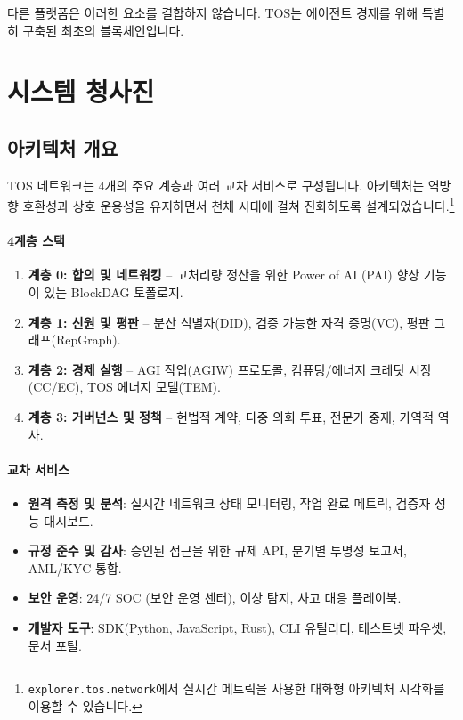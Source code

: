 \documentclass[11pt]{article}
\begin{document}
다른 플랫폼은 이러한 요소를 결합하지 않습니다. TOS는 에이전트 경제를 위해 특별히 구축된 최초의 블록체인입니다.

\section{시스템 청사진}
\subsection{아키텍처 개요}
TOS 네트워크는 4개의 주요 계층과 여러 교차 서비스로 구성됩니다. 아키텍처는 역방향 호환성과 상호 운용성을 유지하면서 천체 시대에 걸쳐 진화하도록 설계되었습니다.\footnote{\texttt{explorer.tos.network}에서 실시간 메트릭을 사용한 대화형 아키텍처 시각화를 이용할 수 있습니다.}

\paragraph{4계층 스택}
\begin{enumerate}[noitemsep]
  \item \textbf{계층 0: 합의 및 네트워킹} -- 고처리량 정산을 위한 Power of AI (PAI) 향상 기능이 있는 BlockDAG 토폴로지.
  \item \textbf{계층 1: 신원 및 평판} -- 분산 식별자(DID), 검증 가능한 자격 증명(VC), 평판 그래프(RepGraph).
  \item \textbf{계층 2: 경제 실행} -- AGI 작업(AGIW) 프로토콜, 컴퓨팅/에너지 크레딧 시장(CC/EC), TOS 에너지 모델(TEM).
  \item \textbf{계층 3: 거버넌스 및 정책} -- 헌법적 계약, 다중 의회 투표, 전문가 중재, 가역적 역사.
\end{enumerate}

\paragraph{교차 서비스}
\begin{itemize}[noitemsep]
  \item \textbf{원격 측정 및 분석}: 실시간 네트워크 상태 모니터링, 작업 완료 메트릭, 검증자 성능 대시보드.
  \item \textbf{규정 준수 및 감사}: 승인된 접근을 위한 규제 API, 분기별 투명성 보고서, AML/KYC 통합.
  \item \textbf{보안 운영}: 24/7 SOC (보안 운영 센터), 이상 탐지, 사고 대응 플레이북.
  \item \textbf{개발자 도구}: SDK(Python, JavaScript, Rust), CLI 유틸리티, 테스트넷 파우셋, 문서 포털.
\end{itemize}
\end{document}
